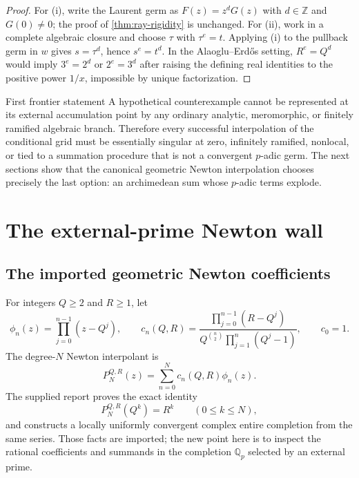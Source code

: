 \documentclass[11pt,oneside]{article}
\theoremstyle{definition}
\newcommand{\Z}{\mathbb Z}
\newcommand{\Qp}{\mathbb Q_p}
\newcommand{\AEconj}{Alaoglu--Erd\H{o}s}
\begin{document}
\begin{proof}
For (i), write the Laurent germ as $F(z)=z^dG(z)$ with $d\in\Z$ and $G(0)\ne0$; the proof of
\cref{thm:ray-rigidity} is unchanged.  For (ii), work in a complete algebraic closure and
choose $\tau$ with $\tau^e=t$.  Applying (i) to the pullback germ in $w$ gives
$s=\tau^d$, hence $s^e=t^d$.  In the \AEconj{} setting, $R^e=Q^d$ would imply
$3^e=2^d$ or $2^e=3^d$ after raising the defining real identities to the positive power
$1/x$, impossible by unique factorization.
\end{proof}

\begin{resultbox}{First frontier statement}
A hypothetical counterexample cannot be represented at its external accumulation point by
any ordinary analytic, meromorphic, or finitely ramified algebraic branch.  Therefore every
successful interpolation of the conditional grid must be essentially singular at zero,
infinitely ramified, nonlocal, or tied to a summation procedure that is not a convergent
$p$-adic germ.  The next sections show that the canonical geometric Newton interpolation
chooses precisely the last option: an archimedean sum whose $p$-adic terms explode.
\end{resultbox}

\section{The external-prime Newton wall}
\label{sec:newton-wall}

\subsection{The imported geometric Newton coefficients}

For integers $Q\ge2$ and $R\ge1$, let
\begin{equation}\label{eq:phi-cn}
 \phi_n(z)=\prod_{j=0}^{n-1}(z-Q^j),
 \qquad
 c_n(Q,R)=
 \frac{\prod_{j=0}^{n-1}(R-Q^j)}
 {Q^{\binom n2}\prod_{j=1}^{n}(Q^j-1)},
 \qquad c_0=1.
\end{equation}
The degree-$N$ Newton interpolant is
\begin{equation}\label{eq:PN}
 P_N^{Q,R}(z)=\sum_{n=0}^{N}c_n(Q,R)\phi_n(z).
\end{equation}
The supplied report proves the exact identity
\begin{equation}\label{eq:native-interpolation}
 P_N^{Q,R}(Q^k)=R^k
 \qquad(0\le k\le N),
\end{equation}
and constructs a locally uniformly convergent complex entire completion from the same
series.  Those facts are imported; the new point here is to inspect the rational coefficients
and summands in the completion $\Qp$ selected by an external prime.
\end{document}
